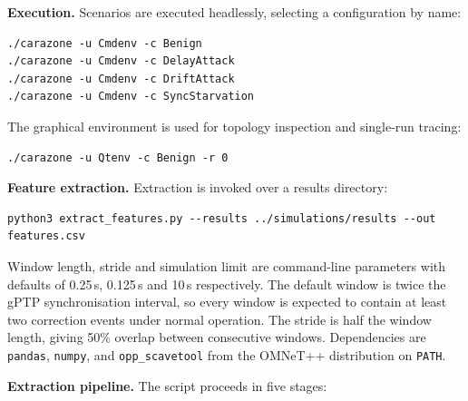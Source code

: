 \textbf{Execution.} Scenarios are executed headlessly, selecting a configuration by
name:
\begin{verbatim}
./carazone -u Cmdenv -c Benign
./carazone -u Cmdenv -c DelayAttack
./carazone -u Cmdenv -c DriftAttack
./carazone -u Cmdenv -c SyncStarvation
\end{verbatim}
The graphical environment is used for topology inspection and single-run tracing:
\begin{verbatim}
./carazone -u Qtenv -c Benign -r 0
\end{verbatim}

\textbf{Feature extraction.} Extraction is invoked over a results directory:
\begin{verbatim}
python3 extract_features.py --results ../simulations/results --out features.csv
\end{verbatim}
Window length, stride and simulation limit are command-line parameters with defaults
of 0.25\,s, 0.125\,s and 10\,s respectively. The default window is twice the gPTP
synchronisation interval, so every window is expected to contain at least two
correction events under normal operation. The stride is half the window length,
giving 50\% overlap between consecutive windows. Dependencies are \texttt{pandas},
\texttt{numpy}, and \texttt{opp\_scavetool} from the OMNeT++ distribution on
\texttt{PATH}.

\textbf{Extraction pipeline.} The script proceeds in five stages:

